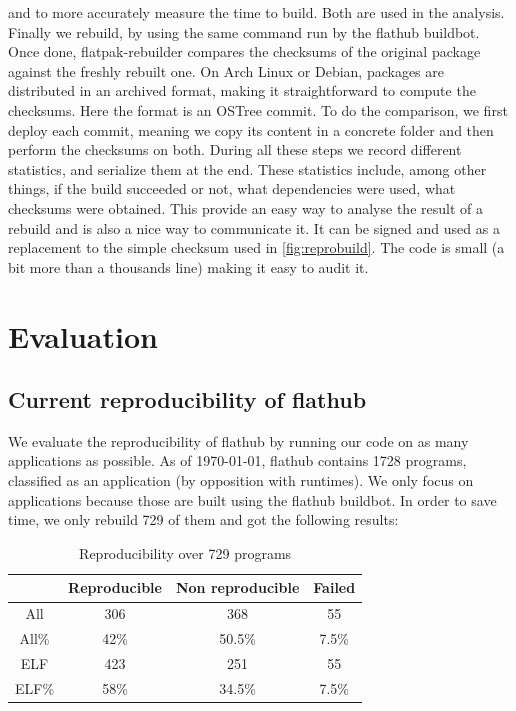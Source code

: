 \documentclass[a4paper,11pt,oneside]{report}
\theoremstyle{definition}
\newcommand{\sysname}{flatpak-rebuilder\xspace}
\newcommand{\fh}{flathub\xspace}
\newcommand{\fhbb}{flathub buildbot\xspace}
\begin{document}
and to more accurately measure the time to build. Both are used in the
analysis. Finally we rebuild, by using the same command run by the \fhbb. Once
done, \sysname compares the checksums of the original package against the
freshly rebuilt one. On Arch Linux or Debian, packages are distributed in an
archived format, making it straightforward to compute the checksums. Here the
format is an OSTree commit. To do the comparison, we first deploy each commit,
meaning we copy its content in a concrete folder and then perform the checksums
on both. During all these steps we record different statistics, and serialize
them at the end. These statistics include, among other things, if the build
succeeded or not, what dependencies were used, what checksums were obtained.
This provide an easy way to analyse the result of a rebuild and is also a nice
way to communicate it. It can be signed and used as a replacement to the simple
checksum used in \autoref{fig:reprobuild}. The code is small (a bit more than a
thousands line) making it easy to audit it.

\chapter{Evaluation}

\section{Current reproducibility of \fh}
\label{sec:cr}
We evaluate the reproducibility of \fh by running our code on as many
applications as possible. As of \today, \fh contains 1728 programs, classified
as an application (by opposition with runtimes). We only focus on applications
because those are built using the \fhbb. In order to save time, we only rebuild
729 of them and got the following results:

\begin{table}[h]
    \centering
        \begin{tabular}{|c|c|c|c|}
            \hline
            & Reproducible & Non reproducible & Failed\\
            \hline
            All & 306 & 368 & 55\\
            \hline
            All\% & 42\% & 50.5\% & 7.5\% \\
            \hline
            ELF & 423 & 251 & 55\\
            \hline
            ELF\% & 58\% & 34.5\% & 7.5\% \\
            \hline
        \end{tabular}
    \caption{Reproducibility over 729 programs}
    \label{tab:rebuild-all}
\end{table}
\end{document}
